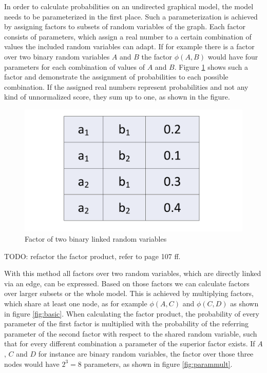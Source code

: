 In order to calculate probabilities on an undirected graphical model, the model needs to be parameterized in the first place. Such a parameterization is achieved by assigning factors to subsets of random variables of the graph. Each factor consists of parameters, which assign a real number to a certain combination of values the included random variables can adapt. If for example there is a factor over two binary random variables $A$ and $B$ the factor $\phi(A,B)$ would have four parameters for each combination of values of $A$ and $B$. Figure \ref{fig:param} shows such a factor and demonstrate the assignment of probabilities to each possible combination. If the assigned real numbers represent probabilities and not any kind of unnormalized score, they sum up to one, as shown in the figure.

\begin{figure}[htpb]
  \centering
  	\includegraphics[scale=0.3]{img/param.pdf} 
  \caption{Factor of two binary linked random variables}
  \label{fig:param}
\end{figure}

TODO: refactor the factor product, refer to \cite{koller2009probabilistic} page 107 ff.

With this method all factors over two random variables, which are directly linked via an edge, can be expressed. Based on those factors we can calculate factors over larger subsets or the whole model. This is achieved by multiplying factors, which share at least one node, as for example $\phi(A,C)$ and $\phi(C,D)$ as shown in figure \ref{fig:basic}. When calculating the factor product, the probability of every parameter of the first factor is multiplied with the probability of the referring parameter of the second factor with respect to the shared random variable, such that for every different combination a parameter of the superior factor exists. If $A$, $C$ and $D$ for instance are binary random variables, the factor over those three nodes would have $2^3=8$ parameters, as shown in figure \ref{fig:parammult}.

